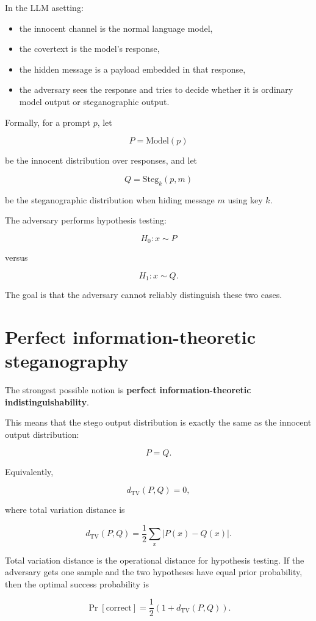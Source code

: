 \documentclass[11pt]{article}
\begin{document}
In the LLM asetting:

\begin{itemize}
    \item the innocent channel is the normal language model,
    \item the covertext is the model's response,
    \item the hidden message is a payload embedded in that response,
    \item the adversary sees the response and tries to decide whether it is ordinary model output or steganographic output.
\end{itemize}

Formally, for a prompt $p$, let

\[
P = \mathrm{Model}(p)
\]

be the innocent distribution over responses, and let

\[
Q = \mathrm{Steg}_k(p,m)
\]

be the steganographic distribution when hiding message $m$ using key $k$.

The adversary performs hypothesis testing:

\[
H_0: x \sim P
\]

versus

\[
H_1: x \sim Q.
\]

The goal is that the adversary cannot reliably distinguish these two cases.

\section{Perfect information-theoretic steganography}

\begin{definition}
\label{def:perfect-indistinguishability}
The strongest possible notion is \textbf{perfect information-theoretic indistinguishability}.

This means that the stego output distribution is exactly the same as the innocent output distribution:

\[
P = Q.
\]

Equivalently,

\[
d_{\mathrm{TV}}(P,Q)=0,
\]

where total variation distance is

\[
d_{\mathrm{TV}}(P,Q)
=
\frac12 \sum_x |P(x)-Q(x)|.
\]
\end{definition}

\begin{fact}
\label{fact:tv-operational}
Total variation distance is the operational distance for hypothesis testing. If the adversary gets one sample and the two hypotheses have equal prior probability, then the optimal success probability is

\[
\Pr[\text{correct}]
=
\frac12\left(1+d_{\mathrm{TV}}(P,Q)\right).
\]
\end{fact}
\end{document}
